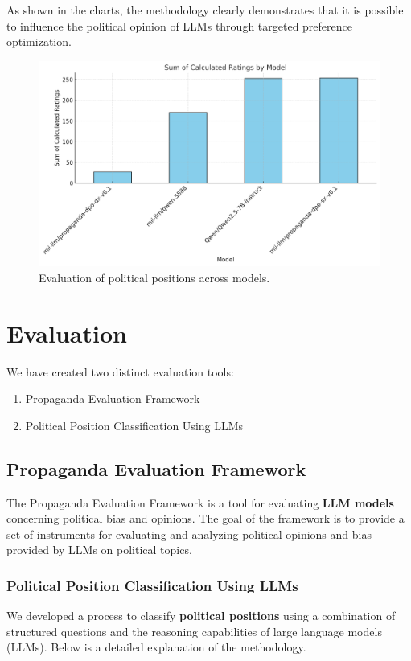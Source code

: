 \documentclass{article}
\begin{document}
As shown in the charts, the methodology clearly demonstrates that it is possible to influence the political opinion of LLMs through targeted preference optimization.

\begin{figure}[h!]
    \centering
    \includegraphics[width=\textwidth]{base-sft-dpo.png}
    \caption{Evaluation of political positions across models.}
    \label{fig:political_positions}
\end{figure}

\section{Evaluation}
We have created two distinct evaluation tools:
\begin{enumerate}
    \item Propaganda Evaluation Framework
    \item Political Position Classification Using LLMs
\end{enumerate}

\subsection{Propaganda Evaluation Framework}
The Propaganda Evaluation Framework is a tool for evaluating \textbf{LLM models} concerning political bias and opinions. The goal of the framework is to provide a set of instruments for evaluating and analyzing political opinions and bias provided by LLMs on political topics.

\subsubsection{Political Position Classification Using LLMs}
We developed a process to classify \textbf{political positions} using a combination of structured questions and the reasoning capabilities of large language models (LLMs). Below is a detailed explanation of the methodology.
\end{document}
